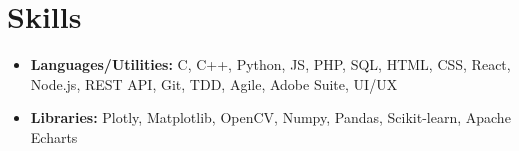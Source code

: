 \documentclass[10.8pt, a4paper]{extarticle}
\newcommand{\shorterSection}[1]{\vspace{-10pt}\section{#1}}
\begin{document}

\shorterSection{Skills}
\vspace{-2pt}
\begin{itemize}
    \item \textbf{Languages/Utilities:} C, C++, Python, JS, PHP, SQL, HTML, CSS, React, Node.js, REST API, Git, TDD, Agile, Adobe Suite, UI/UX
    \item \textbf{Libraries:} Plotly, Matplotlib, OpenCV, Numpy, Pandas, Scikit-learn, Apache Echarts
\end{itemize}
\vspace{0.055cm}
\end{document}

